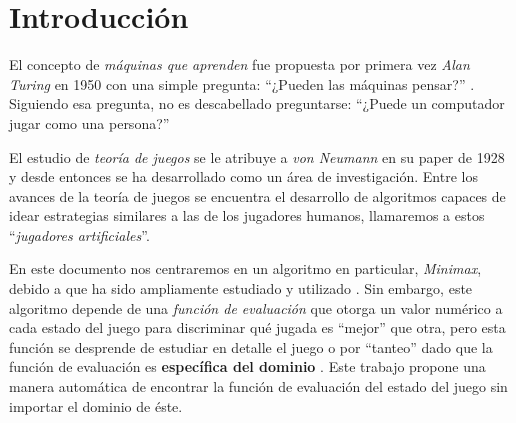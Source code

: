 \section{Introducción}
  El concepto de \textit{máquinas que aprenden} fue propuesta por primera vez \textit{Alan Turing} 
  en 1950 
  con una simple pregunta: \enquote{¿Pueden las máquinas pensar?} \cite{turing_icomputing_1950}.
  Siguiendo esa pregunta, no es descabellado preguntarse: \enquote{¿Puede un computador jugar como 
  una persona?}

  El estudio de \textit{teoría de juegos} se le atribuye a \textit{von Neumann} en su paper de 
  1928 \cite{v_neumann_zur_1928} y desde entonces se ha desarrollado como un área de investigación.
  Entre los avances de la teoría de juegos se encuentra el desarrollo de algoritmos capaces de 
  idear estrategias similares a las de los jugadores humanos, llamaremos a estos 
  \enquote{\textit{jugadores artificiales}}.

  En este documento nos centraremos en un algoritmo en particular, \textit{Minimax}, debido a que ha
  sido ampliamente estudiado y utilizado \cite{v_neumann_zur_1928,fan_minimax_1953,
  maschler_game_2013,thekumparampil_efficient_2019,noauthor_minimax_2022}.
  Sin embargo, este algoritmo depende de una \textit{función de evaluación} que otorga un valor
  numérico a cada estado del juego para discriminar qué jugada es \enquote{mejor} que otra, pero 
  esta función se desprende de estudiar en detalle el juego \cite{shannon_programming_1988} o por 
  \enquote{tanteo} dado que la función de evaluación es \textbf{específica del dominio} 
  \cite{charles_r_dyer_cs_nodate}.
  Este trabajo propone una manera automática de encontrar la función de evaluación del estado del
  juego sin importar el dominio de éste.